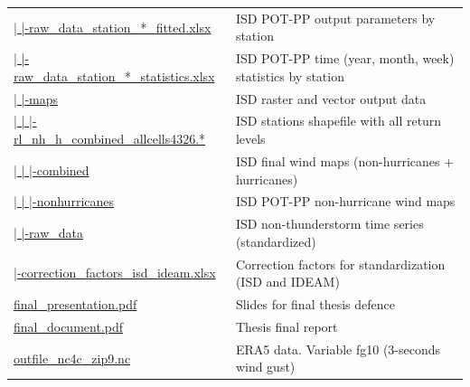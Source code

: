 \documentclass[12pt,oneside]{reedthesis}
\begin{document}
\begin{longtable}[t]{>{\raggedright\arraybackslash}p{2.3in}>{\raggedright\arraybackslash}p{3.3in}}
\href{ftp://ftp.geocorp.co/windthesis/potpp/isd/}{  |    |-raw\_data\_station\_*\_fitted.xlsx} & ISD POT-PP output parameters by station\\
\href{ftp://ftp.geocorp.co/windthesis/potpp/isd/}{  |    |-raw\_data\_station\_*\_statistics.xlsx} & ISD POT-PP time (year, month, week) statistics by station\\
\href{ftp://ftp.geocorp.co/windthesis/potpp/isd/maps/}{  |    |-maps} & ISD raster and vector output data\\
\href{ftp://ftp.geocorp.co/windthesis/potpp/isd/maps/}{  |    |    |-rl\_nh\_h\_combined\_allcells4326.*} & ISD stations shapefile with all return levels\\
\href{ftp://ftp.geocorp.co/windthesis/potpp/isd/maps/combined/}{  |    |    |-combined} & ISD final wind maps (non-hurricanes + hurricanes)\\
\href{ftp://ftp.geocorp.co/windthesis/potpp/isd/maps/nonhurricanes/}{  |    |    |-nonhurricanes} & ISD POT-PP non-hurricane wind maps\\
\href{ftp://ftp.geocorp.co/windthesis/potpp/isd/raw_data/}{  |    |-raw\_data} & ISD non-thunderstorm time series (standardized)\\
\href{ftp://ftp.geocorp.co/windthesis/potpp/correction_factors_isd_ideam.xlsx}{  |-correction\_factors\_isd\_ideam.xlsx} & Correction factors for standardization (ISD and IDEAM)\\
\href{ftp://ftp.geocorp.co/windthesis/final_presentation.pdf}{final\_presentation.pdf} & Slides for final thesis defence\\
\href{ftp://ftp.geocorp.co/windthesis/final_document.pdf}{final\_document.pdf} & Thesis final report\\
\href{ftp://ftp.geocorp.co/windthesis/outfile_nc4c_zip9.nc}{outfile\_nc4c\_zip9.nc} & ERA5 data. Variable fg10 (3-seconds wind gust)\\
\bottomrule
\end{longtable}
\endgroup{}
\end{document}
